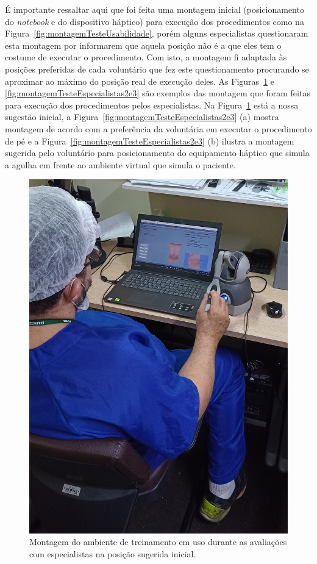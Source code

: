 É importante ressaltar aqui que foi feita uma montagem inicial (posicionamento do \textit{notebook} e do dispositivo háptico) para execução dos procedimentos como na Figura~\ref{fig:montagemTesteUsabilidade}, porém alguns especialistas questionaram esta montagem por informarem que aquela posição não é a que eles tem o costume de executar o procedimento. Com isto, a montagem fi adaptada às posições preferidas de cada voluntário que fez este questionamento procurando se aproximar ao máximo do posição real de execução deles. As Figuras~\ref{fig:montagemTesteEspecialistasInicial} e \ref{fig:montagemTesteEspecialistas2e3} são exemplos das montagem que foram feitas para execução dos procedimentos pelos especialistas. Na Figura~\ref{fig:montagemTesteEspecialistasInicial} está a nossa sugestão inicial, a Figura~\ref{fig:montagemTesteEspecialistas2e3} (a) mostra montagem de acordo com a preferência da voluntária em executar o procedimento de pé e a Figura~\ref{fig:montagemTesteEspecialistas2e3} (b) ilustra a montagem sugerida pelo voluntário para posicionamento do equipamento háptico que simula a agulha em frente ao ambiente virtual que simula o paciente.

\begin{figure}[ht!]
    \centering
    \includegraphics[width=0.4\linewidth]{capitulos/figuras/montagem-teste-especialistas-1.jpg} 
    \caption{Montagem do ambiente de treinamento em uso durante as avaliações com especialistas na posição sugerida inicial.}
    \label{fig:montagemTesteEspecialistasInicial}
\end{figure}

